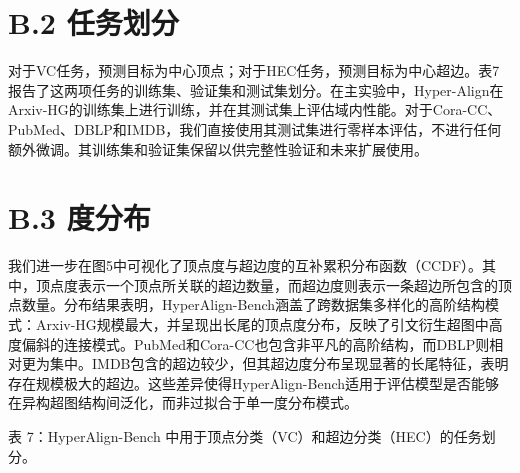 \documentclass[10pt]{article}
\begin{document}
\section*{B.2 任务划分}

对于VC任务，预测目标为中心顶点；对于HEC任务，预测目标为中心超边。表7报告了这两项任务的训练集、验证集和测试集划分。在主实验中，Hyper-Align在Arxiv-HG的训练集上进行训练，并在其测试集上评估域内性能。对于Cora-CC、PubMed、DBLP和IMDB，我们直接使用其测试集进行零样本评估，不进行任何额外微调。其训练集和验证集保留以供完整性验证和未来扩展使用。

\section*{B.3 度分布}

我们进一步在图5中可视化了顶点度与超边度的互补累积分布函数（CCDF）。其中，顶点度表示一个顶点所关联的超边数量，而超边度则表示一条超边所包含的顶点数量。分布结果表明，HyperAlign-Bench涵盖了跨数据集多样化的高阶结构模式：Arxiv-HG规模最大，并呈现出长尾的顶点度分布，反映了引文衍生超图中高度偏斜的连接模式。PubMed和Cora-CC也包含非平凡的高阶结构，而DBLP则相对更为集中。IMDB包含的超边较少，但其超边度分布呈现显著的长尾特征，表明存在规模极大的超边。这些差异使得HyperAlign-Bench适用于评估模型是否能够在异构超图结构间泛化，而非过拟合于单一度分布模式。

表 7：HyperAlign-Bench 中用于顶点分类（VC）和超边分类（HEC）的任务划分。

\begin{center}
\end{center}
\end{document}
